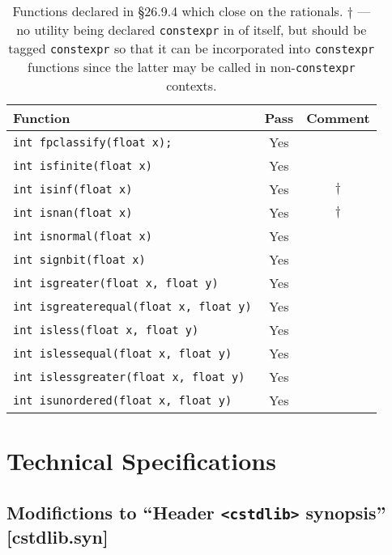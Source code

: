 \documentclass[prd,preprint,amsmath,amssymb,nofootinbib,eqsecnum]{revtex4-1}
\newcommand{\constexpr}{\code{constexpr}\xspace}
\newcommand{\code}[1]{{\tt #1}}
\newcommand{\header}[1]{{\tt <#1>}}
\begin{document}
\begin{table}[h]
	\begin{tabular}{lcc}
		Function & Pass & Comment
	\\
	\hline \hline
		\code{int fpclassify(float x);} & Yes &
	\\
	\hline
		\code{int isfinite(float x)} & Yes &
	\\
	\hline
		\code{int isinf(float x)} & Yes & $\dagger$
	\\
	\hline
		\code{int isnan(float x)} & Yes & $\dagger$ 
	\\
	\hline
		\code{int isnormal(float x)} & Yes &
	\\
	\hline
		\code{int signbit(float x)} & Yes &
	\\
	\hline
		\code{int isgreater(float x, float y)} & Yes &
	\\
	\hline
		\code{int isgreaterequal(float x, float y)} & Yes &
	\\
	\hline
		\code{int isless(float x, float y)} & Yes &
	\\
	\hline
		\code{int islessequal(float x, float y)} & Yes &
	\\
	\hline
		\code{int islessgreater(float x, float y)} & Yes &
	\\
	\hline
		\code{int isunordered(float x, float y)} & Yes &
	\end{tabular}
\caption{Functions declared in \S 26.9.4 which close on the rationals. $\dagger$ --- no utility being declared \constexpr in of itself, but should be tagged \constexpr so that it can be incorporated into \constexpr functions since the latter may be called in  non-\constexpr contexts.}
\label{tab:26.9.4}
\end{table}


\section{Technical Specifications}

\subsection{Modifictions to ``Header \header{cstdlib} synopsis'' [cstdlib.syn]}
\end{document}
